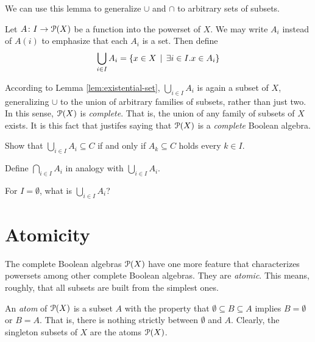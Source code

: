 We can use this lemma to generalize $\cup$ and $\cap$ to arbitrary sets of subsets.

\begin{defn}
Let ${A}\colon{I}\to{{\mathcal{P}}(X)}$ be a function into the powerset of $X$.
We may write $A_i$ instead  of $A(i)$ to emphasize that each $A_i$ is
a set. 
Then define 
\begin{align*}
\bigcup_{i\in I}A_i &= \{x\in X\,\mid\, \exists i\in I.x\in A_i\}\\
\end{align*}
\end{defn}

According to Lemma \ref{lem:existential-set}, $\bigcup_{i\in I}A_i$ is again a subset of $X$, generalizing $\cup$ to the union of arbitrary families of subsets, rather than just two.
In this sense, ${\mathcal{P}}(X)$ is \emph{complete}.
That is, the union of any family of subsets of $X$ exists.
It is this fact that justifes saying that ${\mathcal{P}}(X)$ is a \emph{complete} Boolean algebra.

\begin{exercises}
	\begin{nextexercise}
		\item Show that $\bigcup_{i\in I}A_i\subseteq C$ if and only if $A_k\subseteq C$ holds every $k\in I$.
		\item Define $\bigcap_{i\in I}A_i$ in analogy with $\bigcup_{i\in I}A_i$.
		\item For $I=\emptyset$, what is $\bigcup_{i\in I}A_i$?
	\end{nextexercise}
\end{exercises}

\section{Atomicity}

The complete Boolean algebras ${\mathcal{P}}(X)$ have one more feature that characterizes powersets among other complete Boolean algebras.
They are \emph{atomic}. 
This means, roughly, that all subsets are built from the simplest ones.

An \emph{atom} of ${\mathcal{P}}(X)$ is a subset $A$ with the property that $\emptyset\subseteq B\subseteq A$ implies $B=\emptyset$ or $B=A$. That is, there is nothing strictly between $\emptyset$ and $A$.
Clearly, the singleton subsets of $X$ are the atoms ${\mathcal{P}}(X)$.

